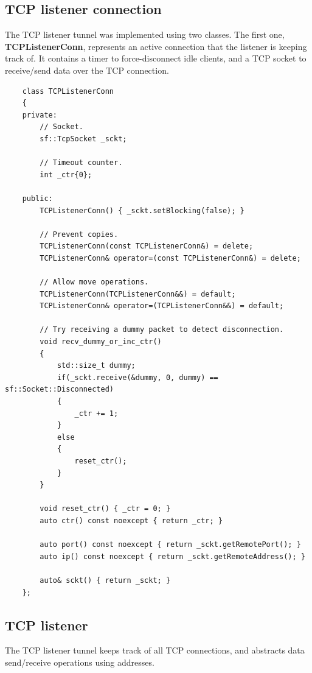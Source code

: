 \documentclass[11pt]{report}
\newcommand{\+}{\discretionary{\mbox{\scriptsize$\hookleftarrow$}}{}{}}
\renewcommand\emph{\textbf}
\begin{document}
        \subsection{TCP listener connection}

            The TCP listener tunnel was implemented using two classes. The first one, \emph{TCPListenerConn}, represents an active connection that the listener is keeping track of. It contains a timer to force-disconnect idle clients, and a TCP socket to receive/send data over the TCP connection.

\begin{verbatim}
    class TCPListenerConn
    {
    private:
        // Socket.
        sf::TcpSocket _sckt;

        // Timeout counter.
        int _ctr{0};

    public:
        TCPListenerConn() { _sckt.setBlocking(false); }

        // Prevent copies.
        TCPListenerConn(const TCPListenerConn&) = delete;
        TCPListenerConn& operator=(const TCPListenerConn&) = delete;

        // Allow move operations.
        TCPListenerConn(TCPListenerConn&&) = default;
        TCPListenerConn& operator=(TCPListenerConn&&) = default;

        // Try receiving a dummy packet to detect disconnection.
        void recv_dummy_or_inc_ctr()
        {
            std::size_t dummy;
            if(_sckt.receive(&dummy, 0, dummy) == sf::Socket::Disconnected)
            {
                _ctr += 1;
            }
            else
            {
                reset_ctr();
            }
        }

        void reset_ctr() { _ctr = 0; }
        auto ctr() const noexcept { return _ctr; }

        auto port() const noexcept { return _sckt.getRemotePort(); }
        auto ip() const noexcept { return _sckt.getRemoteAddress(); }

        auto& sckt() { return _sckt; }
    };
\end{verbatim}

        \subsection{TCP listener}

            The TCP listener tunnel keeps track of all TCP connections, and abstracts data send/receive operations using addresses.
\end{document}
